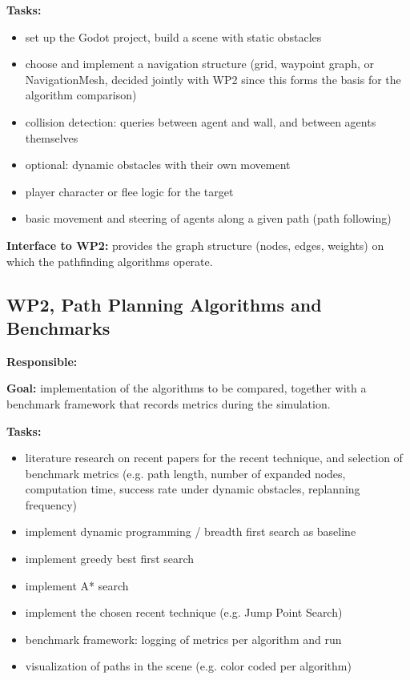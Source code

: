 \documentclass[11pt,a4paper]{article}
\begin{document}
\textbf{Tasks:}
\begin{itemize}[leftmargin=1.2em]
  \item set up the Godot project, build a scene with static obstacles
  \item choose and implement a navigation structure (grid, waypoint graph,
  or NavigationMesh, decided jointly with WP2 since this forms the basis
  for the algorithm comparison)
  \item collision detection: queries between agent and wall, and between
  agents themselves
  \item optional: dynamic obstacles with their own movement
  \item player character or flee logic for the target
  \item basic movement and steering of agents along a given path (path
  following)
\end{itemize}

\textbf{Interface to WP2:} provides the graph structure (nodes, edges,
weights) on which the pathfinding algorithms operate.

\subsection*{WP2, Path Planning Algorithms and Benchmarks}

\textbf{Responsible:} \underline{\hspace{4cm}}

\textbf{Goal:} implementation of the algorithms to be compared, together
with a benchmark framework that records metrics during the simulation.

\textbf{Tasks:}
\begin{itemize}[leftmargin=1.2em]
  \item literature research on recent papers for the recent technique, and
  selection of benchmark metrics (e.g. path length, number of expanded
  nodes, computation time, success rate under dynamic obstacles,
  replanning frequency)
  \item implement dynamic programming / breadth first search as baseline
  \item implement greedy best first search
  \item implement A* search
  \item implement the chosen recent technique (e.g. Jump Point Search)
  \item benchmark framework: logging of metrics per algorithm and run
  \item visualization of paths in the scene (e.g. color coded per
  algorithm)
\end{itemize}
\end{document}
